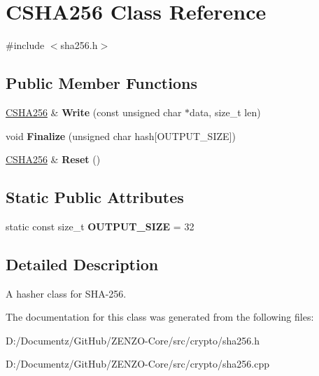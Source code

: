 \hypertarget{class_c_s_h_a256}{}\section{C\+S\+H\+A256 Class Reference}
\label{class_c_s_h_a256}


{\ttfamily \#include $<$sha256.\+h$>$}

\subsection*{Public Member Functions}
\begin{DoxyCompactItemize}
\item 
\mbox{\label{class_c_s_h_a256_a9d7de520a562655da85349372820c883}} 
\mbox{\hyperlink{class_c_s_h_a256}{C\+S\+H\+A256}} \& {\bfseries Write} (const unsigned char $\ast$data, size\+\_\+t len)
\item 
\mbox{\label{class_c_s_h_a256_a4259230be0caefa590bc324fc12b9b90}} 
void {\bfseries Finalize} (unsigned char hash\mbox{[}O\+U\+T\+P\+U\+T\+\_\+\+S\+I\+ZE\mbox{]})
\item 
\mbox{\label{class_c_s_h_a256_a2122395dd5604990eaa0077b43a0e8d4}} 
\mbox{\hyperlink{class_c_s_h_a256}{C\+S\+H\+A256}} \& {\bfseries Reset} ()
\end{DoxyCompactItemize}
\subsection*{Static Public Attributes}
\begin{DoxyCompactItemize}
\item 
\mbox{\label{class_c_s_h_a256_a3d7ef512c0ceb0008396e62f5c4771fc}} 
static const size\+\_\+t {\bfseries O\+U\+T\+P\+U\+T\+\_\+\+S\+I\+ZE} = 32
\end{DoxyCompactItemize}


\subsection{Detailed Description}
A hasher class for S\+H\+A-\/256. 

The documentation for this class was generated from the following files\+:\begin{DoxyCompactItemize}
\item 
D\+:/\+Documentz/\+Git\+Hub/\+Z\+E\+N\+Z\+O-\/\+Core/src/crypto/sha256.\+h\item 
D\+:/\+Documentz/\+Git\+Hub/\+Z\+E\+N\+Z\+O-\/\+Core/src/crypto/sha256.\+cpp\end{DoxyCompactItemize}
